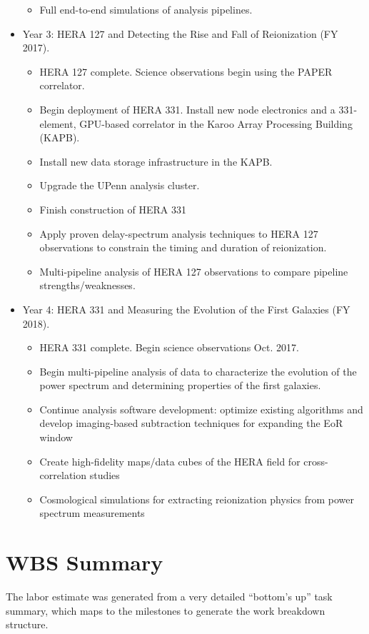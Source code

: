\documentclass[preprint]{aastex}
\begin{document}
\begin{itemize}[itemsep=-4pt,parsep=-3pt]
\begin{itemize}[itemsep=-4pt]
\item Full end-to-end simulations of analysis pipelines.
\end{itemize}
\item Year 3:  HERA 127 and Detecting the Rise and Fall of Reionization (FY 2017). 
\begin{itemize}[itemsep=-4pt]
\item HERA 127 complete. Science observations begin using the PAPER correlator. 
\item Begin deployment of HERA 331. Install new node electronics and a 331-element, GPU-based correlator in the Karoo Array Processing Building (KAPB). 
\item Install new data storage infrastructure in the KAPB. 
\item Upgrade the UPenn analysis cluster. 
\item Finish construction of HERA 331
\item Apply proven delay-spectrum analysis techniques to HERA 127 observations to constrain the timing and duration of reionization. 
\item Multi-pipeline analysis of HERA 127 observations to compare pipeline strengths/weaknesses.
\end{itemize}
\item Year 4:  HERA 331 and Measuring the Evolution of the First Galaxies (FY 2018). 
\begin{itemize}[itemsep=-4pt]
\item HERA 331 complete. Begin science observations Oct. 2017. 
\item Begin multi-pipeline analysis of data to characterize the evolution of the power spectrum and determining properties of the first galaxies. 
\item Continue analysis software development: optimize existing algorithms and develop imaging-based subtraction techniques for expanding the EoR window
\item Create high-fidelity maps/data cubes of the HERA field for cross-correlation studies
\item Cosmological simulations for extracting reionization physics from power spectrum measurements
\end{itemize}
\end{itemize}

\section{WBS Summary}
\label{sec:wbs}
The labor estimate was generated from a very detailed ``bottom's up'' task summary, which maps to the milestones to generate the work breakdown structure.
\end{document}
